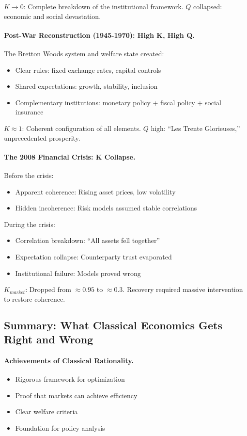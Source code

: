 \documentclass[12pt,a4paper]{article}
\begin{document}
$K \to 0$: Complete breakdown of the institutional framework.
$Q$ collapsed: economic and social devastation.

\paragraph{Post-War Reconstruction (1945-1970): High K, High Q.}
The Bretton Woods system and welfare state created:
\begin{itemize}
  \item Clear rules: fixed exchange rates, capital controls
  \item Shared expectations: growth, stability, inclusion
  \item Complementary institutions: monetary policy + fiscal policy + social insurance
\end{itemize}

$K \approx 1$: Coherent configuration of all elements.
$Q$ high: ``Les Trente Glorieuses,'' unprecedented prosperity.

\paragraph{The 2008 Financial Crisis: K Collapse.}
Before the crisis:
\begin{itemize}
  \item Apparent coherence: Rising asset prices, low volatility
  \item Hidden incoherence: Risk models assumed stable correlations
\end{itemize}

During the crisis:
\begin{itemize}
  \item Correlation breakdown: ``All assets fell together''
  \item Expectation collapse: Counterparty trust evaporated
  \item Institutional failure: Models proved wrong
\end{itemize}

$K_{market}$: Dropped from $\approx 0.95$ to $\approx 0.3$.
Recovery required massive intervention to restore coherence.

\subsection{Summary: What Classical Economics Gets Right and Wrong}

\paragraph{Achievements of Classical Rationality.}
\begin{itemize}
  \item Rigorous framework for optimization
  \item Proof that markets can achieve efficiency
  \item Clear welfare criteria
  \item Foundation for policy analysis
\end{itemize}
\end{document}
